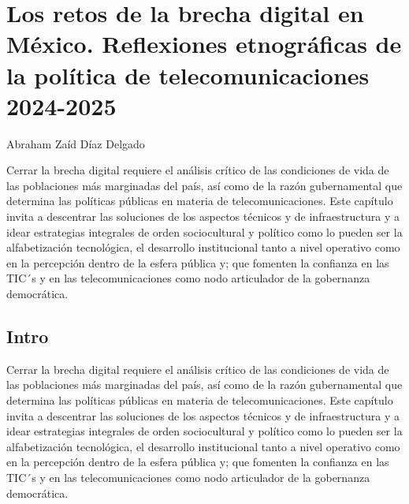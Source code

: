 \documentclass[
  spanish,
  11.5pt,
  170mm x 240mmpaper,
]{scrbook}
\begin{document}

\chapter{Los retos de la brecha digital en México. Reflexiones
etnográficas de la política de telecomunicaciones
2024-2025}\label{los-retos-de-la-brecha-digital-en-muxe9xico.-reflexiones-etnogruxe1ficas-de-la-poluxedtica-de-telecomunicaciones-2024-2025}

Abraham Zaíd Díaz Delgado

Cerrar la brecha digital requiere el análisis crítico de las condiciones
de vida de las poblaciones más marginadas del país, así como de la razón
gubernamental que determina las políticas públicas en materia de
telecomunicaciones. Este capítulo invita a descentrar las soluciones de
los aspectos técnicos y de infraestructura y a idear estrategias
integrales de orden sociocultural y político como lo pueden ser la
alfabetización tecnológica, el desarrollo institucional tanto a nivel
operativo como en la percepción dentro de la esfera pública y; que
fomenten la confianza en las TIC´s y en las telecomunicaciones como nodo
articulador de la gobernanza democrática.

\hfill\break

\section*{Intro}\label{intro}



Cerrar la brecha digital requiere el análisis crítico de las condiciones
de vida de las poblaciones más marginadas del país, así como de la razón
gubernamental que determina las políticas públicas en materia de
telecomunicaciones. Este capítulo invita a descentrar las soluciones de
los aspectos técnicos y de infraestructura y a idear estrategias
integrales de orden sociocultural y político como lo pueden ser la
alfabetización tecnológica, el desarrollo institucional tanto a nivel
operativo como en la percepción dentro de la esfera pública y; que
fomenten la confianza en las TIC´s y en las telecomunicaciones como nodo
articulador de la gobernanza democrática.

\end{document}
